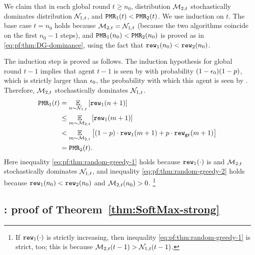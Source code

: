 We claim that in each global round $t\geq n_0$, distribution $\mathcal{M}_{2,t}$ stochastically dominates distribution $\mathcal{N}_{1,t}$, and $\mathtt{PMR}_1(t)<\mathtt{PMR}_2(t)$. We use induction on $t$. The base case $t=n_0$ holds because $\mathcal{M}_{2,t} = \mathcal{N}_{1,t}$ (because the two algorithms coincide on the first $n_0-1$ steps), and $\mathtt{PMR}_1(n_0)<\mathtt{PMR}_2(n_0)$ is proved as in \eqref{eq:pf:thm:DG-dominance}, using the fact that $\mathtt{rew}_1(n_0)<\mathtt{rew}_2(n_0)$.

The induction step is proved as follows. The induction hypothesis for global round $t-1$ implies that agent $t-1$ is seen by \alg with probability $(1-\epsilon_0)(1-p)$, which is strictly larger than $\epsilon_0$, the probability with which this agent is seen by \alg[2]. Therefore, $\mathcal{M}_{2,t}$ stochastically dominates $\mathcal{N}_{1,t}$.
\begin{align}
\mathtt{PMR}_1(t)
  &= \operatorname*{\mathbb{E}}_{n\sim \mathcal{N}_{1,t}}\left[\mathtt{rew}_1(n+1)\right] \nonumber \\
  &\leq \operatorname*{\mathbb{E}}_{m\sim \mathcal{M}_{2,t}}\left[\mathtt{rew}_1(m+1)\right]
    \label{eq:pf:thm:random-greedy-1}\\
  &< \operatorname*{\mathbb{E}}_{m\sim \mathcal{M}_{2,t}}\left[(1-p)\cdot \mathtt{rew}_1(m+1) + p\cdot \mathtt{rew}_{\texttt{gr}}(m+1)\right]
    \label{eq:pf:thm:random-greedy-2} \\
  &= \mathtt{PMR}_2(t). \nonumber
\end{align}
Here inequality \eqref{eq:pf:thm:random-greedy-1} holds because $\mathtt{rew}_1(\cdot)$ is \bmonotone and $\mathcal{M}_{2,t}$ stochastically dominates $\mathcal{N}_{1,t}$, and inequality \eqref{eq:pf:thm:random-greedy-2} holds because $\mathtt{rew}_1(n_0)<\mathtt{rew}_2(n_0)$ and $\mathcal{M}_{2,t}(n_0)>0$.%
\footnote{If $\mathtt{rew}_1(\cdot)$ is strictly increasing, then inequality \eqref{eq:pf:thm:random-greedy-1} is strict, too; this is because $\mathcal{M}_{2,t}(t-1)>\mathcal{N}_{1,t}(t-1)$.  }



\subsection{\SoftMaxRandom: proof of Theorem~\ref{thm:SoftMax-strong}}
\label{sec:proofs-SoftMax}

